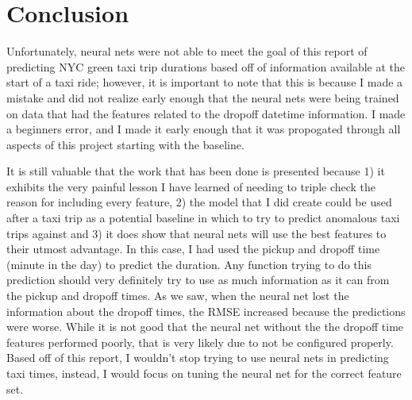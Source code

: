 \documentclass[conference]{IEEEtran}
\begin{document}
\section{Conclusion}
Unfortunately, neural nets were not able to meet the goal of this report of predicting NYC green taxi trip durations based off of information available at the start of a taxi ride; however, it is important to note that this is because I made a mistake and did not realize early enough that the neural nets were being trained on data that had the features related to the dropoff datetime information.  I made a beginners error, and I made it early enough that it was propogated through all aspects of this project starting with the baseline.  

It is still valuable that the work that has been done is presented because 1) it exhibits the very painful lesson I have learned of needing to triple check the reason for including every feature, 2) the model that I did create could be used after a taxi trip as a potential baseline in which to try to predict anomalous taxi trips against and 3) it does show that neural nets will use the best features to their utmost advantage.  In this case, I had used the pickup and dropoff time (minute in the day) to predict the duration.  Any function trying to do this prediction should very definitely try to use as much information as it can from the pickup and dropoff times.  As we saw, when the neural net lost the information about the dropoff times, the RMSE increased because the predictions were worse.  While it is not good that the neural net without the the dropoff time features performed poorly, that is very likely due to not be configured properly.  Based off of this report, I wouldn't stop trying to use neural nets in predicting taxi times, instead, I would focus on tuning the neural net for the correct feature set.










\end{document}
